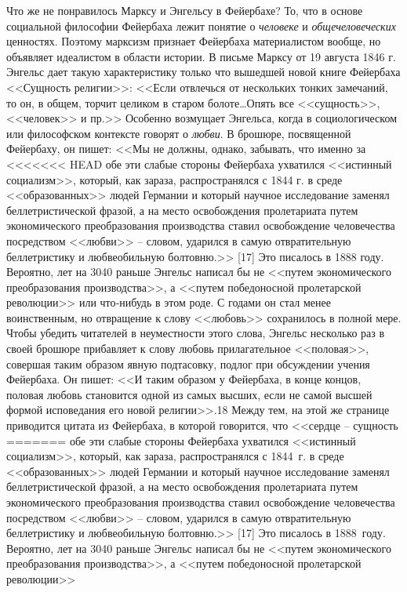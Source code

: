 \documentclass{book}
\begin{document}
Что же не понравилось Марксу и Энгельсу в Фейербахе? То, что в основе социальной философии Фейербаха лежит понятие о 
\textit{человеке}  и \textit{общечеловеческих} ценностях. Поэтому марксизм признает Фейербаха материалистом вообще, но объявляет 
иде­алистом в области истории. В письме Марксу от 19 августа 1846 г. Энгельс дает такую характеристику только что вышед­шей новой 
книге Фейербаха <<Сущность религии>>: <<Если от­влечься от нескольких тонких замечаний, то он, в общем, торчит целиком в старом 
болоте\ldots Опять все <<сущность>>, <<человек>> и пр.>> Особенно возмущает Энгельса, когда в социологическом или философском 
контексте говорят о \textit{любви}.  В брошюре, по­священной Фейербаху, он пишет: <<Мы не должны, однако, забы­вать, что именно за 
<<<<<<< HEAD
обе эти слабые стороны Фейербаха ухватился <<истинный социализм>>, который, как зараза, распространялся с 1844 г. в среде 
<<образованных>> людей Германии и который научное исследование заменял беллетристической фразой, а на место освобождения 
пролетариата путем экономического пре­образования производства ставил освобождение человечества посредством <<любви>> -- словом, 
ударился в самую отвратитель­ную беллетристику и любвеобильную болтовню.>> [17] Это писа­лось в 1888 году. Вероятно, лет на 3040 
раньше Энгельс написал бы не <<путем экономического преобразования производства>>, а <<путем победоносной пролетарской революции>> 
или что‑нибудь в этом роде. С годами он стал менее воинственным, но отвращение к слову <<любовь>> сохранилось в полной мере. Чтобы 
убедить читателей в неуместности этого слова, Энгельс несколько раз в своей брошюре прибавляет к слову любовь прилагательное 
<<половая>>, совершая таким образом явную подтасовку, подлог при обсуждении учения Фейербаха. Он пи­шет: <<И таким образом у 
Фейербаха, в конце концов, половая любовь становится одной из самых высших, если не самой выс­шей формой исповедания его новой 
религии>>.18 Между тем, на этой же странице приводится цитата из Фейербаха, в кото­рой говорится, что <<сердце -- сущность 
=======
обе эти слабые стороны Фейербаха ухватился <<истинный социализм>>, который, как зараза, распространялся с 1844~г. в среде 
<<образованных>> людей Германии и который научное исследование заменял беллетристической фразой, а на место освобождения 
пролетариата путем экономического пре­образования производства ставил освобождение человечества посредством <<любви>> -- словом, 
ударился в самую отвратитель­ную беллетристику и любвеобильную болтовню.>> [17] Это писа­лось в 1888~году. Вероятно, лет на 3040 
раньше Энгельс написал бы не <<путем экономического преобразования производства>>, а <<путем победоносной пролетарской революции>> 
\end{document}
